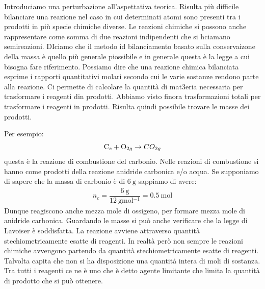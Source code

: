 \documentclass[../AppuntiChimica]{subfiles}
\begin{document}
	Introduciamo una perturbazione all'aspettativa teorica. Risulta più difficile bilanciare una reazione nel caso in cui determinati atomi sono presenti tra i prodotti in più specie chimiche diverse. Le reazioni chimiche si possono anche rappresentare come somma di due reazioni indipendenti che si hciamano semireazioni. DIciamo che il metodo id bilanciamento basato sulla conservaizone della massa è quello più generale piossibile e in generale questa è la legge a cui bisogna fare riferimento. Possiamo dire che una reazione chimica bilanciata esprime i rapporti quantitativi molari secondo cui le varie sostanze rendono parte alla reazione. Ci permette di calcolare la quantità di mat3eria necessaria per trasformare i reagenti din prodotti. Abbiamo visto finora trasformazioni totali per trasformare i reagenti in prodotti. Risulta quindi possibile trovare le masse dei prodotti.
	
	Per esempio:
	\begin{gather*}
	\text{C}_{s}+\text{O}_{2g}\to
	CO_{2g}
	\end{gather*}
	 questa è la reazione di combustione del carbonio. Nelle reazioni di combustione si hanno come prodotti della reazione anidride carbonica e/o acqua. Se supponiamo di sapere che la massa di carbonio è di $ \SI{6}{\gram} $ sappiamo di avere:
	 \begin{gather*}
	 n_{c}=\dfrac{\SI{6}{\gram}}{\SI{12}{\gram\mole^{-1}}}=\SI{0.5}{\mole}
	 \end{gather*}
	 Dunque reagiscono anche mezza mole di ossigeno, per formare mezza mole di anidride carbonica. Guardando le masse si può anche verificare che la legge di Lavoiser è soddisfatta. La reazione avviene attraverso quantità stechiometricamente esatte di reagenti. In realtà però non sempre le reazioni chimiche avvengono partendo da quantità stechiometricamente esatte di reagenti. Talvolta capita che non si ha  disposizione una quantità intera di moli di sostanza. Tra tutti i reagenti ce ne è uno che è detto agente limitante che limita la quantità di prodotto che si può ottenere.
	 
\end{document}
